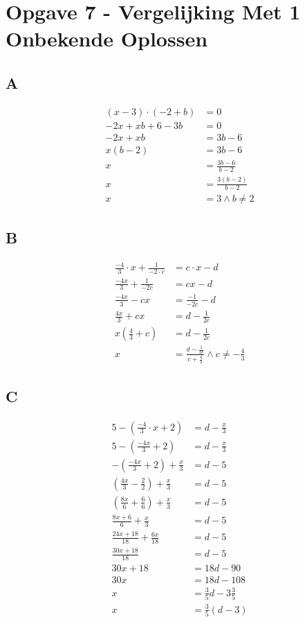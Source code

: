 \documentclass[fleqn]{article}
\begin{document}
\clearpage
\section{Opgave 7 - Vergelijking Met 1 Onbekende Oplossen}
\subsection{A}
\begin{align*}
(x-3)\cdot (-2 + b) &= 0 \\
-2x + xb +6 -3b &= 0 \\
-2x + xb &= 3b - 6  \\ 
x(b - 2) &= 3b - 6  \\
x &= \frac{3b -6}{b - 2}  \\
x &= \frac{3(b-2)}{b-2}  \\ 
x &= 3 \wedge b \neq 2
\end{align*}

\subsection{B}
\begin{align*}
\frac{-4}{3} \cdot x + \frac{1}{-2 \cdot c} &= c \cdot x - d \\ 
\frac{-4x}{3} + \frac{1}{-2c} &= cx - d \\ 
\frac{-4x}{3} -cx &= \frac{-1}{-2c} - d \\ 
\frac{4x}{3} + cx &= d -\frac{1}{2c} \\ 
x(\frac{4}{3} + c) &= d -\frac{1}{2c} \\ 
x &= \frac{d -\frac{1}{2c}}{c + \frac{4}{3}} \wedge c \neq -\frac{4}{3}
\end{align*}

\subsection{C}
\begin{align*}
5 - (\frac{-4}{3} \cdot x + 2) &= d - \frac{x}{3}\\
5 - (\frac{-4x}{3} + 2) &= d - \frac{x}{3} \\ 
- (\frac{-4x}{3} + 2) + \frac{x}{3} &= d - 5 \\
(\frac{4x}{3} - \frac{2}{2}) + \frac{x}{3} &= d - 5 \\ 
(\frac{8x}{6} + \frac{6}{6}) + \frac{x}{3} &= d - 5 \\ 
\frac{8x+6}{6} + \frac{x}{3} &= d - 5 \\
\frac{24x + 18}{18} + \frac{6x}{18} &= d - 5 \\
\frac{30x + 18}{18} &= d - 5\\ 
30x + 18 &= 18d - 90 \\ 
30x &= 18d - 108 \\ 
x &= \frac{3}{5}d - 3\frac{3}{5} \\ 
x &= \frac{3}{5}(d - 3)
\end{align*}
\end{document}

